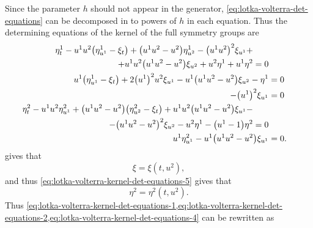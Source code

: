 Since the parameter \(h\) should not appear in the generator, \cref{eq:lotka-volterra-det-equations} can be decomposed in to powers of \(h\) in each equation.
Thus the determining equations of the kernel of the full symmetry groups are
\begin{subequations}\label{eq:lotka-volterra-kernel-det-equations}
  \begin{align}
    \begin{split}\label{eq:lotka-volterra-kernel-det-equations-1}
      \eta^1_t - u^1 u^2 \qty(\eta^1_{u^1} - \xi_t) + \qty(u^1 u^2 - u^2) \eta^1_{u^2} - \qty(u^1 u^2)^2 \xi_{u^1} +&\\
      + u^1 u^2 \qty(u^1 u^2 - u^2) \xi_{u^2} + u^2 \eta^1 + u^1 \eta^2 &= 0
    \end{split}\\
    \label{eq:lotka-volterra-kernel-det-equations-2}
    u^1 \qty(\eta^1_{u^1} - \xi_t) + 2 \qty(u^1)^2 u^2 \xi_{u^1} - u^1 \qty(u^1 u^2 - u^2) \xi_{u^2} - \eta^1 &= 0 \\
    \label{eq:lotka-volterra-kernel-det-equations-3}
    - \qty(u^1)^2 \xi_{u^1} &= 0 \\
    \begin{split}\label{eq:lotka-volterra-kernel-det-equations-4}
      \eta^2_t - u^1 u^2 \eta^2_{u^1} + \qty(u^1 u^2 - u^2) \qty(\eta^2_{u^2} - \xi_t) + u^1 u^2 \qty(u^1 u^2 - u^2) \xi_{u^1} -&\\
      - \qty(u^1 u^2 - u^2)^2 \xi_{u^2} - u^2 \eta^1 - \qty(u^1 - 1) \eta^2 &= 0
    \end{split}\\
    \label{eq:lotka-volterra-kernel-det-equations-5}
    u^1 \eta^2_{u^1} - u^1 \qty(u^1 u^2 - u^2) \xi_{u^1} &= 0. 
  \end{align}
\end{subequations}
 gives that
\begin{equation}
  \xi = \xi(t, u^2),
\end{equation}
and thus \cref{eq:lotka-volterra-kernel-det-equations-5} gives that
\begin{equation}
  \eta^2 = \eta^2(t, u^2).
\end{equation}
Thus \cref{eq:lotka-volterra-kernel-det-equations-1,eq:lotka-volterra-kernel-det-equations-2,eq:lotka-volterra-kernel-det-equations-4} can be rewritten as
